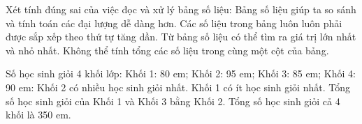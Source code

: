\begin{ex} %
Xét tính đúng sai của việc đọc và xử lý bảng số liệu:
\choiceTF
{\True Bảng số liệu giúp ta so sánh và tính toán các đại lượng dễ dàng hơn.}
{Các số liệu trong bảng luôn luôn phải được sắp xếp theo thứ tự tăng dần.}
{\True Từ bảng số liệu có thể tìm ra giá trị lớn nhất và nhỏ nhất.}
{Không thể tính tổng các số liệu trong cùng một cột của bảng.}
\end{ex}

\begin{ex} %
Số học sinh giỏi 4 khối lớp: Khối 1: 80 em; Khối 2: 95 em; Khối 3: 85 em; Khối 4: 90 em:
\choiceTF
{\True Khối 2 có nhiều học sinh giỏi nhất.}
{\True Khối 1 có ít học sinh giỏi nhất.}
{Tổng số học sinh giỏi của Khối 1 và Khối 3 bằng Khối 2.}
{\True Tổng số học sinh giỏi cả 4 khối là 350 em.}
\end{ex}

